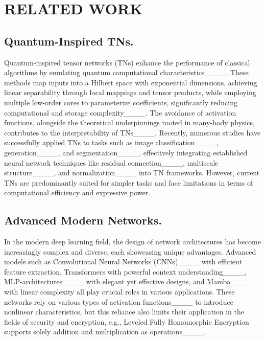 \section{RELATED WORK}
\subsection{Quantum-Inspired TNs.}
Quantum-inspired tensor networks (TNs) enhance the performance of classical algorithms by emulating quantum computational characteristics____. These methods map inputs into a Hilbert space with exponential dimensions, achieving linear separability through local mappings and tensor products, while employing multiple low-order cores to parameterize coefficients, significantly reducing computational and storage complexity____. The avoidance of activation functions, alongside the theoretical underpinnings rooted in many-body physics, contributes to the interpretability of TNs____. Recently, numerous studies have successfully applied TNs to tasks such as image classification____, generation____, and segmentation____, effectively integrating established neural network techniques like residual connection____, multiscale structure____, and normalization____ into TN frameworks.
However, current TNs are predominantly suited for simpler tasks and face limitations in terms of computational efficiency and expressive power.


\subsection{Advanced Modern Networks.}
In the modern deep learning field, the design of network architectures has become increasingly complex and diverse, each showcasing unique advantages. Advanced models such as Convolutional Neural Networks (CNNs)____ with efficient feature extraction, Transformers with powerful context understanding____, MLP-architectures____ with elegant yet effective designs, and Mamba____ with linear complexity all play crucial roles in various applications. These networks rely on various types of activation functions____ to introduce nonlinear characteristics, but this reliance also limits their application in the fields of security and encryption, e.g., Leveled Fully Homomorphic Encryption supports solely addition and multiplication as operations____.

